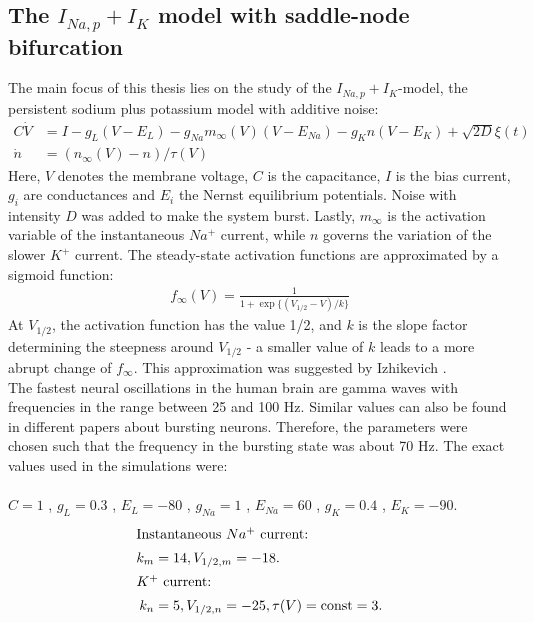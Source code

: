 \documentclass[12pt,a4paper]{article}
\begin{document}
\subsection{The $I_{Na,p}+I_K$ model with saddle-node bifurcation}\label{inapikwsn}
The main focus of this thesis lies on the study of the $I_{Na,p}+I_K$-model, the persistent sodium plus potassium model with additive noise:
\begin{align}\label{Veq}
C\dot{V} &= I - g_L(V-E_L) - g_{Na}m_{\infty}(V)(V-E_{Na}) - g_Kn(V-E_K)+\sqrt{2D}\xi(t)\\\label{neq}
\dot{n} &= (n_{\infty}(V)-n)/\tau(V)
\end{align}
Here, $V$ denotes the membrane voltage, $C$ is the capacitance, $I$ is the bias current, $g_i$ are conductances and $E_i$ the Nernst equilibrium potentials. Noise with intensity $D$ was added to make the system burst. Lastly, $m_{\infty}$ is the activation variable of the instantaneous $Na^+$ current, while $n$ governs the variation of the slower $K^+$ current. The steady-state activation functions are approximated by a sigmoid function:
\begin{align*}
f_{\infty}(V) = \frac{1}{1+\exp\{(V_{1/2}-V)/k\}}
\end{align*}
At $V_{1/2}$, the activation function has the value 1/2, and $k$ is the slope factor determining the steepness around $V_{1/2}$ - a smaller value of $k$ leads to a more abrupt change of $f_{\infty}$. This approximation was suggested by Izhikevich \cite{izi}.\\
The fastest neural oscillations in the human brain are gamma waves with frequencies in the range between 25 and 100 Hz\cite{gamma}\cite{gamma2}. Similar values can also be found in different papers about bursting neurons\cite{burstneu}\cite{burstneu2}. Therefore, the parameters were chosen such that the frequency in the bursting state was about 70 Hz.
The exact values used in the simulations were:\\\\
$C=1$ , $g_L=0.3$ , $E_L=-80$ , $g_{Na}=1$ , $E_{Na}=60$ , $g_K=0.4$ , $E_K=-90$.
\begin{align*}
\intertext{Instantaneous $Na^+$ current:} k_m&=14 , V_{1/2,m}=-18. 
\\
\intertext{$K^+$ current:} k_n&=5 , V_{1/2,n}=-25 , \tau(V)=\text{const}=3.
\end{align*}
\end{document}
